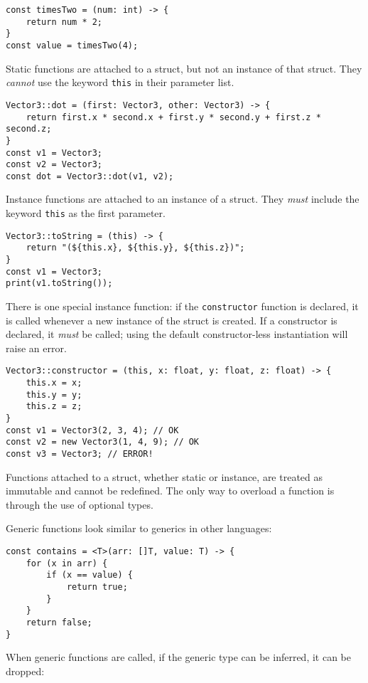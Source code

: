 \documentclass[12pt]{article}
\begin{document}
\begin{lstlisting}
const timesTwo = (num: int) -> {
	return num * 2;
}
const value = timesTwo(4);
\end{lstlisting}

Static functions are attached to a struct, but not an instance of that struct. They \emph{cannot} use the keyword \lstinline!this! in their parameter list.

\begin{lstlisting}
Vector3::dot = (first: Vector3, other: Vector3) -> {
	return first.x * second.x + first.y * second.y + first.z * second.z;
}
const v1 = Vector3;
const v2 = Vector3;
const dot = Vector3::dot(v1, v2);
\end{lstlisting}

Instance functions are attached to an instance of a struct. They \emph{must} include the keyword \lstinline!this! as the first parameter.

\begin{lstlisting}
Vector3::toString = (this) -> {
	return "(${this.x}, ${this.y}, ${this.z})";
}
const v1 = Vector3;
print(v1.toString());
\end{lstlisting}

There is one special instance function: if the \lstinline!constructor! function is declared, it is called whenever a new instance of the struct is created. If a constructor is declared, it \emph{must} be called; using the default constructor-less instantiation will raise an error.

\begin{lstlisting}
Vector3::constructor = (this, x: float, y: float, z: float) -> {
	this.x = x;
	this.y = y;
	this.z = z;
}
const v1 = Vector3(2, 3, 4); // OK
const v2 = new Vector3(1, 4, 9); // OK
const v3 = Vector3; // ERROR!
\end{lstlisting}

Functions attached to a struct, whether static or instance, are treated as immutable and cannot be redefined. The only way to overload a function is through the use of optional types.

Generic functions look similar to generics in other languages:

\begin{lstlisting}
const contains = <T>(arr: []T, value: T) -> {
	for (x in arr) {
		if (x == value) {
			return true;
		}
	}
	return false;
}
\end{lstlisting}

When generic functions are called, if the generic type can be inferred, it can be dropped:
\end{document}
